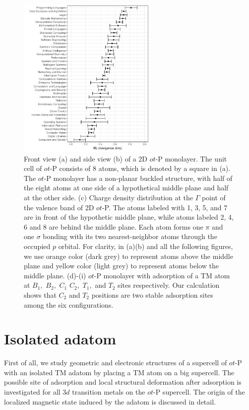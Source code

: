 \documentclass[%
superscriptaddress,
preprint,
showpacs,preprintnumbers,
 amsmath,amssymb,
prb,
]{revtex4-1}
\begin{document}
\begin{figure}[ptb]
\centering
\includegraphics [width=0.6\textwidth]{fig1.pdf}
\caption{{\footnotesize{}Front view (a) and side view (b) of a 2D $ot$-P monolayer. The unit cell of $ot$-P consists of 8 atoms, which is denoted by a square in (a). The $ot$-P monolayer has a non-planar buckled structure, with half of the eight atoms at one side of a hypothetical middle plane and half at the other side. (c) Charge density distribution at the $\Gamma$ point of the valence band of 2D $ot$-P. The atoms labeled with 1, 3, 5, and 7 are in front of the hypothetic middle plane, while atoms labeled 2, 4, 6 and 8 are behind the middle plane. Each atom forms one $\pi$ and one $\sigma$ bonding with its two nearest-neighbor atoms through the occupied $p$ orbital. For clarity, in (a)(b) and all the following figures, we use orange color (dark grey) to represent atoms above the middle plane and yellow color (light grey) to represent atoms below the middle plane. (d)-(i) $ot$-P monolayer with adsorption of a TM atom at $B_{1},$ $B_{2},$ $C_{1}$ $C_{2},$ $T_{1},$ and $T_{2}$ sites respectively. Our calculation shows that $C_{2}$ and $T_{2}$ positions are two stable adsorption sites among the six configurations. \label{fig:$ot$-P+AdSites}}}
\label{fig1}
\end{figure}




\section{Isolated adatom}

First of all, we study geometric and electronic structures of a supercell of $ot$-P with an isolated TM adatom by placing a TM atom on a big supercell. The possible site of adsorption and local structural deformation after adsorption is investigated for all 3$d$ transition metals on the $ot$-P supercell. The origin of the localized magnetic state induced by the adatom is discussed in detail.
\end{document}
